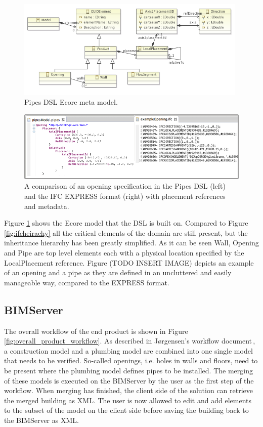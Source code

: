 \begin{figure}[t]
    \centering
        \includegraphics[width=110mm]{images/PipesEcoreModel.png}
    \caption{Pipes DSL Ecore meta model.}
    \label{fig:pipes_dsl_ecore_model}
\end{figure}

\begin{figure}[t]
    \centering
        \includegraphics[width=120mm]{images/pipesAndExpressExample.png}
    \caption{A comparison of an opening specification in the Pipes DSL (left) and the IFC EXPRESS format (right) with placement references and metadata.}
    \label{fig:pipes_express_comparison}
\end{figure}

Figure \ref{fig:pipes_dsl_ecore_model} shows the Ecore model that the DSL is built on. Compared to Figure \ref{fig:ifcheirachy} all the critical elements of the domain are still present, but the inheritance hierarchy has been greatly simplified. As it can be seen Wall, Opening and Pipe are top level elements each with a physical location specified by the LocalPlacement reference. Figure (TODO INSERT IMAGE) depicts an example of an opening and a pipe as they are defined in an uncluttered and easily manageable way, compared to the EXPRESS format.

\subsection{BIMServer}
The overall workflow of the end product is shown in Figure \ref{fig:overall_product_workflow}. As described in J\o rgensen's workflow document\,\cite{jorgensen12}, a construction model and a plumbing model are combined into one single model that needs to be verified. So-called openings, i.e. holes in walls and floors, need to be present where the plumbing model defines pipes to be installed. The merging of these models is executed on the BIMServer by the user as the first step of the workflow. When merging has finished, the client side of the solution can retrieve the merged building as XML. The user is now allowed to edit and add elements to the subset of the model on the client side before saving the building back to the BIMServer as XML.

